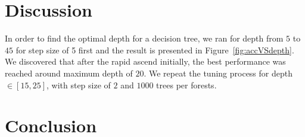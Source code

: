 \documentclass[english,notitlepage,reprint,nofootinbib]{revtex4-1}
\begin{document}
\section{Discussion}\label{sec:discussion}
%
In order to find the optimal depth for a decision tree, we ran for depth from $ 5 $ to $ 45 $ for step size of 5 first and the result is presented in Figure~\ref{fig:accVSdepth}. We discovered that after the rapid ascend initially, the best performance was reached around maximum depth of $ 20 $. We repeat the tuning process for depth $ \in [15, 25] $, with step size of $ 2 $ and $ 1000 $ trees per forests. 

\section{Conclusion}\label{sec:conclusion}

\onecolumngrid

%

\end{document}
